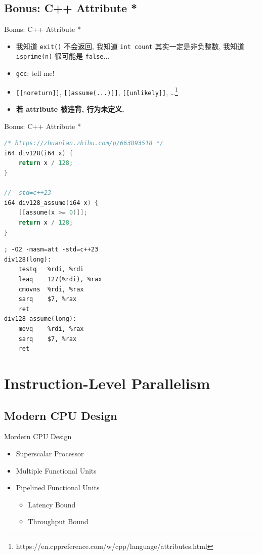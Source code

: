 ﻿\documentclass{ctexbeamer}
\begin{document}
\subsection{Bonus: C++ Attribute *}

\begin{frame}{Bonus: C++ Attribute *}
  \begin{itemize}
    \item 我知道 \texttt{exit()} 不会返回, 我知道 \texttt{int count} 其实一定是非负整数, 我知道 \texttt{isprime(n)} 很可能是 \texttt{false}...
    \pause
    \item \texttt{gcc}: tell me!
    \item \texttt{[[noreturn]]}, \texttt{[[assume(...)]]}, \texttt{[[unlikely]]}, \dots\footnote{https://en.cppreference.com/w/cpp/language/attributes.html}
    \pause
    \item \textbf{若 attribute 被违背, 行为未定义.}
  \end{itemize}
\end{frame}

\begin{frame}[fragile, shrink=5]{Bonus: C++ Attribute *}
  \begin{lstlisting}[language=C]
/* https://zhuanlan.zhihu.com/p/663893518 */
i64 div128(i64 x) {
    return x / 128;
}

// -std=c++23
i64 div128_assume(i64 x) {
    [[assume(x >= 0)]];
    return x / 128;
}
  \end{lstlisting}

  \begin{lstlisting}[language=x86_64]
; -O2 -masm=att -std=c++23
div128(long):
    testq   %rdi, %rdi
    leaq    127(%rdi), %rax
    cmovns  %rdi, %rax
    sarq    $7, %rax
    ret
div128_assume(long):
    movq    %rdi, %rax
    sarq    $7, %rax
    ret
  \end{lstlisting}
\end{frame}

\section{Instruction-Level Parallelism}

\subsection{Modern CPU Design}

\begin{frame}{Mordern CPU Design}
  \begin{itemize}
    \item Superscalar Processor
    \pause
    \item Multiple Functional Units
    \pause
    \item Pipelined Functional Units
    \begin{itemize}
      \item Latency Bound
      \item Throughput Bound
    \end{itemize}
  \end{itemize}
\end{frame}
\end{document}
